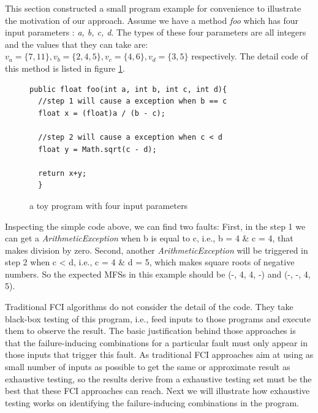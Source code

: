 \documentclass{sig-alternate}
\begin{document}
This section constructed a small program example for convenience to illustrate the motivation of our approach. Assume we have a method \emph{foo} which has four input parameters : \emph{a, b, c, d}. The types of these four parameters are all integers and the values that they can take are: $v_{a} = \{7, 11\}, v_{b} = \{2, 4, 5\}, v_{c} = \{4, 6\}, v_{d} = \{3, 5\}$ respectively.  The detail code of this method is listed in figure \ref{toy-program}.
\begin{figure}
\begin{verbatim}
public float foo(int a, int b, int c, int d){
  //step 1 will cause a exception when b == c
  float x = (float)a / (b - c);

  //step 2 will cause a exception when c < d
  float y = Math.sqrt(c - d);

  return x+y;
  }
\end{verbatim}
\caption{a toy program with four input parameters}
\label{toy-program}
\end{figure}

Inspecting the simple code above, we can find two faults: First, in the step 1 we can get a \emph{ArithmeticException} when b is equal to c, i.e.,  b = 4 \& c = 4, that makes division by zero. Second, another \emph{ArithmeticException} will be triggered in step 2 when c < d, i.e., c = 4 \& d = 5, which makes square roots of negative numbers. So the expected MFSs in this example should be (-, 4, 4, -) and (-, -, 4, 5).

Traditional FCI algorithms do not consider the detail of the code. They take black-box testing of this program, i.e., feed inputs to those programs and execute them to observe the result. The basic justification behind those approaches is that the failure-inducing combinations for a particular fault must only appear in those inputs that trigger this fault. As traditional FCI approaches aim at using as small number of inputs as possible to get the same or approximate result as exhaustive testing, so the results derive from a exhaustive testing set must be the best that these FCI approaches can reach. Next we will illustrate how exhaustive testing works on identifying the failure-inducing combinations in the program.
\end{document}
